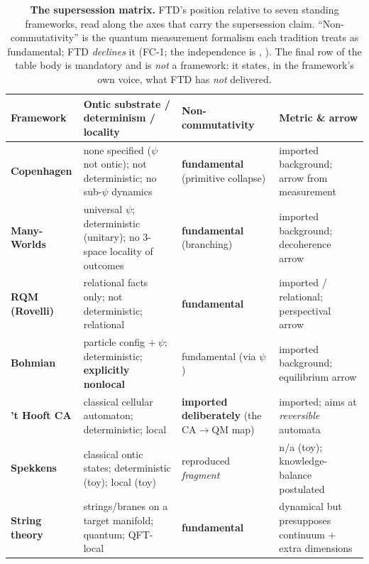 \begin{table}[t]
  \centering
  \footnotesize
  \caption[The supersession matrix]{\textbf{The supersession matrix.} FTD's
    position relative to seven standing frameworks, read along the axes that
    carry the supersession claim. ``Non-commutativity'' is the quantum
    measurement formalism each tradition treats as fundamental; FTD
    \emph{declines} it (FC-1; the independence is , ). The
    final row of the table body is mandatory and is \emph{not} a framework: it
    states, in the framework's own voice, what FTD has \emph{not} delivered.}
  \label{tab:supersession}
  \setlength{\tabcolsep}{4pt}
  \renewcommand{\arraystretch}{1.25}
  \begin{tabular}{@{}>{\RaggedRight}p{1.85cm} >{\RaggedRight}p{6.0cm}
      >{\RaggedRight\arraybackslash}p{2.55cm} >{\RaggedRight\arraybackslash}p{3.2cm}@{}}
    \toprule
    \textbf{Framework} & \textbf{Ontic substrate / determinism / locality} &
    \textbf{Non-commutativity} & \textbf{Metric \& arrow} \\
    \midrule
    \textbf{Copenhagen} &
      none specified ($\psi$ not ontic); not deterministic; no sub-$\psi$
      dynamics & \textbf{fundamental} (primitive collapse) &
      imported background; arrow from measurement \\
    \textbf{Many-Worlds} &
      universal $\psi$; deterministic (unitary); no $3$-space locality of
      outcomes & \textbf{fundamental} (branching) &
      imported background; decoherence arrow \\
    \textbf{RQM (Rovelli)} &
      relational facts only; not deterministic; relational &
      \textbf{fundamental} & imported / relational; perspectival arrow \\
    \textbf{Bohmian} &
      particle config $+\ \psi$; deterministic; \textbf{explicitly nonlocal} &
      fundamental (via $\psi$) & imported background; equilibrium arrow \\
    \textbf{'t Hooft CA} &
      classical cellular automaton; deterministic; local &
      \textbf{imported deliberately} (the CA$\to$QM map) &
      imported; aims at \emph{reversible} automata \\
    \textbf{Spekkens} &
      classical ontic states; deterministic (toy); local (toy) &
      reproduced \emph{fragment} & n/a (toy); knowledge-balance postulated \\
    \textbf{String theory} &
      strings/branes on a target manifold; quantum; QFT-local &
      \textbf{fundamental} &
      dynamical but presupposes continuum $+$ extra dimensions \\

\end{tabular}
\end{table}
